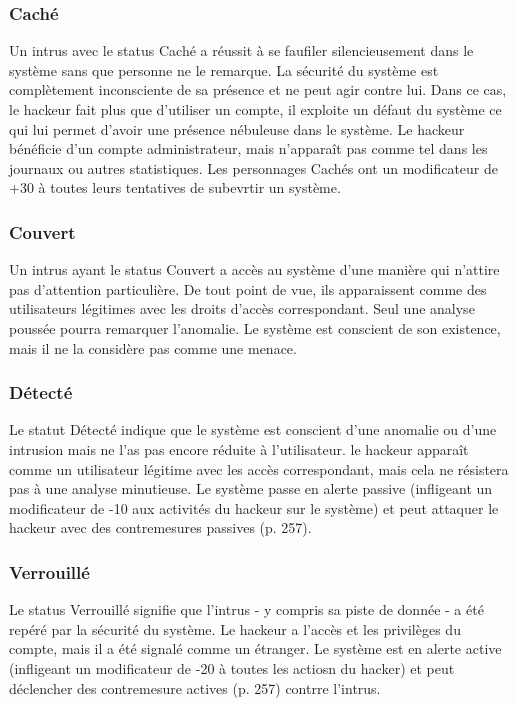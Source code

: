 \subsubsection{Caché} 

Un intrus avec le status Caché a réussit à se faufiler silencieusement dans le système sans que personne ne le remarque. La sécurité du système est complètement inconsciente de sa présence et ne peut agir contre lui. Dans ce cas, le hackeur fait plus que d'utiliser un compte, il exploite un défaut du système ce qui lui permet d'avoir une présence nébuleuse dans le système. Le hackeur bénéficie d'un compte administrateur, mais n'apparaît pas comme tel dans les journaux ou autres statistiques. Les personnages Cachés ont un modificateur de +30 à toutes leurs tentatives de subevrtir un système. 

\subsubsection{Couvert} 

Un intrus ayant le status Couvert a accès au système d'une manière qui n'attire pas d'attention particulière. De tout point de vue, ils apparaissent comme des utilisateurs légitimes avec les droits d'accès correspondant. Seul une analyse poussée pourra remarquer l'anomalie. Le système est conscient de son existence, mais il ne la considère pas comme une menace. 

\subsubsection{Détecté} 

Le statut Détecté indique que le système est conscient d'une anomalie ou d'une intrusion mais ne l'as pas encore réduite à l'utilisateur. le hackeur apparaît comme un utilisateur légitime avec les accès correspondant, mais cela ne résistera pas à une analyse minutieuse. Le système passe en alerte passive (infligeant un modificateur de -10 aux activités du hackeur sur le système) et peut attaquer le hackeur avec des contremesures passives (p. 257). 

\subsubsection{Verrouillé} 

Le status Verrouillé signifie que l'intrus - y compris sa piste de donnée - a été repéré par la sécurité du système. Le hackeur a l'accès et les privilèges du compte, mais il a été signalé comme un étranger. Le système est en alerte active (infligeant un modificateur de -20 à toutes les actiosn du hacker) et peut déclencher des contremesure actives (p. 257) contrre l'intrus. 

